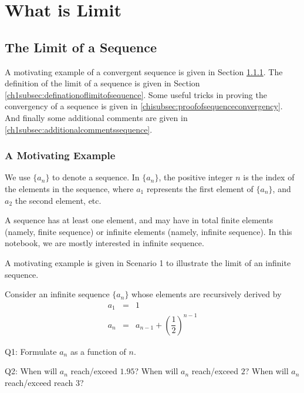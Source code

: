 \chapter{What is Limit}

\section{The Limit of a Sequence} \label{ch1sec:limitofsequence}

A motivating example of a convergent sequence is given in Section \ref{ch1subsec:sequencemotivatingexample}. The definition of the limit of a sequence is given in Section \ref{ch1subsec:definationoflimitofsequence}. Some useful tricks in proving the convergency of a sequence is given in \ref{chisubsec:proofofsequenceconvergency}. And finally some additional comments are given in \ref{ch1subsec:additionalcommentssequence}.

\subsection{A Motivating Example} \label{ch1subsec:sequencemotivatingexample}

We use $\{a_n\}$ to denote a sequence. In $\{a_n\}$, the positive integer $n$ is the index of the elements in the sequence, where $a_1$ represents the first element of $\{a_n\}$, and $a_2$ the second element, etc.

A sequence has at least one element, and may have in total finite elements (namely, finite sequence) or infinite elements (namely, infinite sequence). In this notebook, we are mostly interested in infinite sequence.

A motivating example is given in Scenario 1 to illustrate the limit of an infinite sequence.

\begin{shortbox}

Consider an infinite sequence $\{a_n\}$ whose elements are recursively derived by
\begin{eqnarray}
  a_1 &=& 1 \label{ch1eq:motivatingexampleinitialcondition} \\
  a_n &=& a_{n-1} + \left(\dfrac{1}{2}\right)^{n-1} \label{ch1eq:motivatingexamplerecursive}
\end{eqnarray}

Q1: Formulate $a_n$ as a function of $n$.

Q2: When will $a_n$ reach/exceed $1.95$? When will $a_n$ reach/exceed $2$? When will $a_n$ reach/exceed reach $3$?
\end{shortbox}

